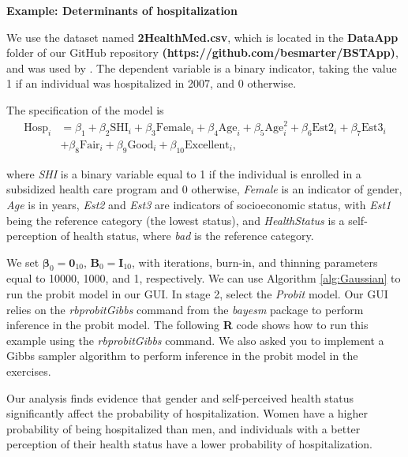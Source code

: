 \textbf{Example: Determinants of hospitalization}

We use the dataset named \textbf{2HealthMed.csv}, which is located in the \textbf{DataApp} folder of our GitHub repository \textbf{(https://github.com/besmarter/BSTApp)}, and was used by \cite{Ramirez2013}. The dependent variable is a binary indicator, taking the value 1 if an individual was hospitalized in 2007, and 0 otherwise.

The specification of the model is
\begin{align*}
	\text{Hosp}_i&={\beta}_1+{\beta}_2\text{SHI}_i+{\beta}_3\text{Female}_i+{\beta}_4\text{Age}_i+{\beta}_5\text{Age}_i^2+{\beta}_6\text{Est2}_i+{\beta}_7\text{Est3}_i\\
	&+{\beta}_8\text{Fair}_i+{\beta}_9\text{Good}_i+{\beta}_{10}\text{Excellent}_i,
\end{align*}

where \textit{SHI} is a binary variable equal to 1 if the individual is enrolled in a subsidized health care program and 0 otherwise, \textit{Female} is an indicator of gender, \textit{Age} is in years, \textit{Est2} and \textit{Est3} are indicators of socioeconomic status, with \textit{Est1} being the reference category (the lowest status), and \textit{HealthStatus} is a self-perception of health status, where \textit{bad} is the reference category.

We set $\bm{\beta}_0 = {\bm{0}}_{10}$, ${\bm{B}}_0 = {\bm{I}}_{10}$, with iterations, burn-in, and thinning parameters equal to 10000, 1000, and 1, respectively. We can use Algorithm \ref{alg:Gaussian} to run the probit model in our GUI. In stage 2, select the \textit{Probit} model. Our GUI relies on the \textit{rbprobitGibbs} command from the \textit{bayesm} package to perform inference in the probit model. The following \textbf{R} code shows how to run this example using the \textit{rbprobitGibbs} command. We also asked you to implement a Gibbs sampler algorithm to perform inference in the probit model in the exercises.

Our analysis finds evidence that gender and self-perceived health status significantly affect the probability of hospitalization. Women have a higher probability of being hospitalized than men, and individuals with a better perception of their health status have a lower probability of hospitalization.

